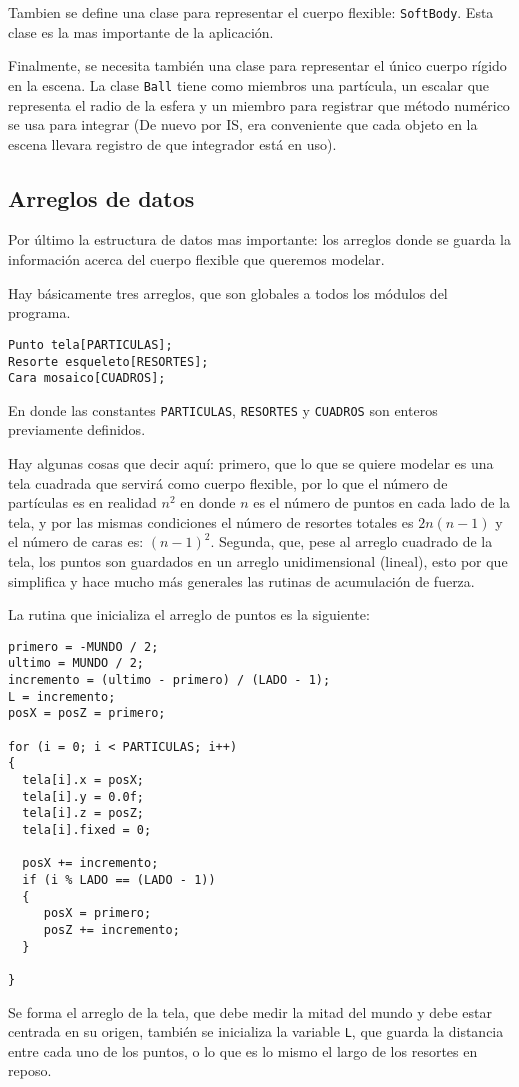Tambien se define una clase para representar el cuerpo flexible: \texttt{SoftBody}. Esta clase es la mas importante de la aplicación.
  
Finalmente, se necesita también una clase para representar el único cuerpo rígido en la escena. La clase \texttt{Ball} tiene como miembros una partícula, un escalar que representa el radio de la esfera y un miembro para registrar que método numérico se usa para integrar (De nuevo por IS, era conveniente que cada objeto en la escena llevara registro de que integrador está en uso).

\subsection{Arreglos de datos}

Por último la estructura de datos mas importante: los arreglos donde se guarda la información acerca del cuerpo flexible que queremos modelar.

Hay básicamente tres arreglos, que son globales a todos los módulos del programa.
\begin{verbatim}
Punto tela[PARTICULAS];
Resorte esqueleto[RESORTES];
Cara mosaico[CUADROS];
\end{verbatim} 
En donde las constantes \verb|PARTICULAS|, \verb|RESORTES| y \verb|CUADROS| son enteros previamente definidos.

Hay algunas cosas que decir aquí: primero, que lo que se quiere modelar es una tela cuadrada que servirá como cuerpo flexible, por lo que el número de partículas es en realidad $n^{2}$ en donde $n$ es el número de puntos en cada lado de la tela, y por las mismas condiciones el número de resortes totales es $2 n (n - 1)$ y el número de caras es: $(n-1)^{2}$.
Segunda, que, pese al arreglo cuadrado de la tela, los puntos son guardados en un arreglo unidimensional (lineal), esto por que simplifica y hace mucho más generales las rutinas de acumulación de fuerza.

La rutina que inicializa el arreglo de puntos es la siguiente:
\begin{verbatim}
primero = -MUNDO / 2;
ultimo = MUNDO / 2;
incremento = (ultimo - primero) / (LADO - 1);
L = incremento;
posX = posZ = primero;

for (i = 0; i < PARTICULAS; i++)
{
  tela[i].x = posX;
  tela[i].y = 0.0f;
  tela[i].z = posZ;
  tela[i].fixed = 0;

  posX += incremento;
  if (i % LADO == (LADO - 1))
  {
     posX = primero;
     posZ += incremento;
  }

}
\end{verbatim} 
Se forma el arreglo de la tela, que debe medir la mitad del mundo y debe estar centrada en su origen, también se inicializa la variable \verb|L|, que guarda la distancia entre cada uno de los puntos, o lo que es lo mismo el largo de los resortes en reposo.

